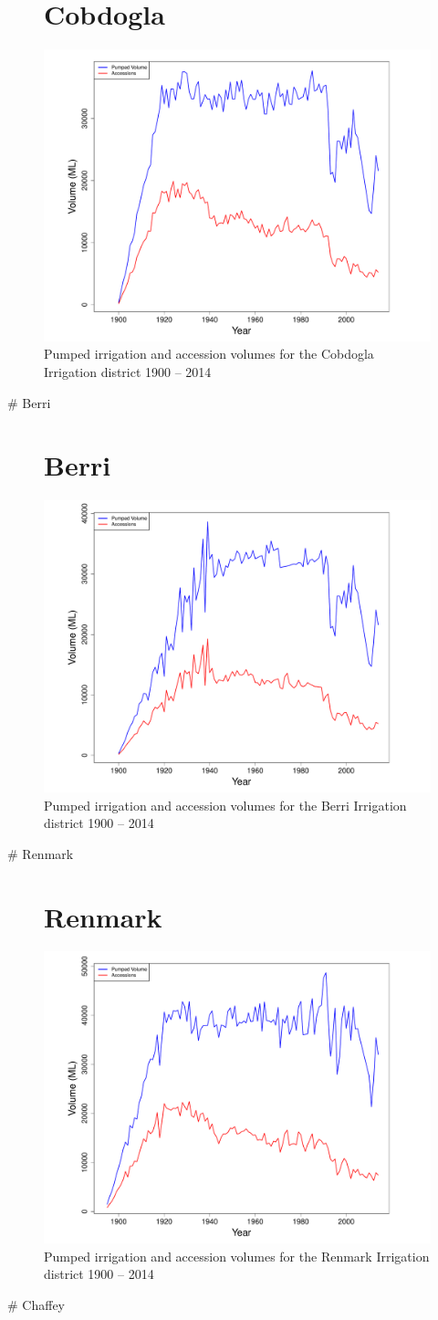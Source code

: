 \documentclass[a4paper, titlepage, 12pt]{article}\usepackage[]{graphicx}\usepackage[]{color}
\newenvironment{knitrout}{}{} %
\begin{document}
\begin{sffamily}
\begin{appendices}
\begin{figure}
\section{Cobdogla}
\begin{knitrout}
\color{fgcolor}
\includegraphics[width=0.95	extwidth]{../figures/Cobdogla-1} 

\end{knitrout}
\caption{Pumped irrigation and accession volumes for the Cobdogla Irrigation district 1900 -- 2014}
\label{fig03}
\end{figure}

# Berri 
\begin{figure}
\section{Berri}
\begin{knitrout}
\color{fgcolor}
\includegraphics[width=0.95	extwidth]{../figures/Berri-1} 

\end{knitrout}
\caption{Pumped irrigation and accession volumes for the Berri Irrigation district 1900 -- 2014}
\label{fig03}
\end{figure}


# Renmark 
\begin{figure}
\section{Renmark}
\begin{knitrout}
\color{fgcolor}
\includegraphics[width=0.95	extwidth]{../figures/Renmark-1} 

\end{knitrout}
\caption{Pumped irrigation and accession volumes for the Renmark Irrigation district 1900 -- 2014}
\label{fig03}
\end{figure}

# Chaffey 
\begin{figure}

\end{figure}
\end{appendices}
\end{sffamily}
\end{document}
